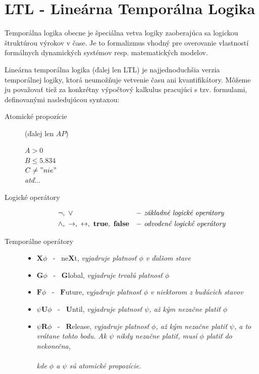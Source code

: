 \documentclass[11pt,final,oneside]{fithesis}
\begin{document}
\section{LTL - Line\' arna Tempor\' alna Logika}
\label{sec:logika}
Tempor\' alna logika obecne je \v speci\' alna vetva logiky zaoberaj\' uca sa logickou \v strukt\' urou v\' yrokov v \v case. 
Je to formalizmus vhodn\' y pre overovanie vlastnost\' i form\' alnych dynamick\' ych syst\' emov resp. matematick\' ych modelov.

Line\' arna tempor\' alna logika (\v dalej len LTL) je najjednoduch\v sia verzia tempor\' alnej logiky, ktor\' a neumo\v z\v nuje vetvenie \v casu 
ani kvantifik\' atory.
M\^ o\v zeme ju pova\v zova\v t tie\v z za konkr\' etny v\' ypo\v ctov\' y kalkulus pracuj\' uci s tzv. formulami, definovan\' ymi nasleduj\' ucou syntaxou:
\begin{description}
\item[Atomick\' e propoz\' icie] (\v dalej len $AP$) \hfill
\begin{center}
$A > 0$ \\
$B \leq 5.834$ \\
$C \neq "nie"$ \\
{\it at\v d$\dots{}$}
\end{center}
\item[Logick\' e oper\' atory] \hfill
\begin{align*}
&\neg, \ \vee &-& \ \textrm{\it z\' akladn\' e logick\' e oper\' atory}\\
&\wedge , \ \rightarrow , \ \leftrightarrow , \ \mathbf{true} , \ \mathbf{false} \hfil &-& \ \textrm{\it odvoden\' e logick\' e oper\' atory}
\end{align*}
\item[Tempor\' alne oper\' atory] \hfill
\begin{itemize}
\item $\mathbf{X} \phi$ \ - \ \textrm{ne}$\mathbf{X}$\textrm{t, {\it vyjadruje platnos\v t $\phi$ v \v dal\v som stave}}
\item $\mathbf{G} \phi$ \ - \ $\mathbf{G}$\textrm{lobal, {\it vyjadruje trval\' u platnos\v t $\phi$ }}
\item {$\mathbf{F} \phi$} \ - \ $\mathbf{F}$\textrm{uture, {\it vyjadruje platnos\v t $\phi$ v niektorom z bud\' ucich stavov }}
\item {$\psi \mathbf{U} \phi$} \ - \ $\mathbf{U}$\textrm{ntil, {\it vyjadruje platnos\v t $\psi$, a\v z k\'ym neza\v cne plati\v t $\phi$}}
\item {$\psi \mathbf{R} \phi$} \ - \ $\mathbf{R}$\textrm{elease, {\it vyjadruje platnos\v t $\phi$, a\v z k\'ym neza\v cne plati\v t $\psi$, 
a to vr\'atane tohto bodu. Ak $\psi$ nikdy neza\v cne plati\v t, mus\'i $\phi$ plati\v t do nekone\v cna}},\\
\\
{\it kde $\phi$ a $\psi$ s\' u atomick\' e propoz\' icie.}
\end{itemize}
\end{description}
\end{document}
